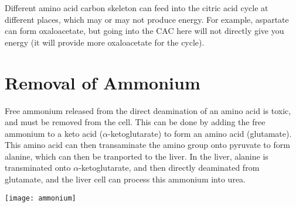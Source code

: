 Different amino acid carbon skeleton can feed into the citric acid cycle at different places, which may or may not produce energy.
For example, aspartate can form oxaloacetate, but going into the CAC here will not directly give you energy (it will provide more oxaloacetate for the cycle).

\section{Removal of Ammonium}

Free ammonium released from the direct deamination of an amino acid is toxic, and must be removed from the cell.
This can be done by adding the free ammonium to a keto acid ($\alpha$-ketoglutarate) to form an amino acid (glutamate).
This amino acid can then transaminate the amino group onto pyruvate to form alanine, which can then be tranported to the liver.
In the liver, alanine is transminated onto $\alpha$-ketoglutarate, and then directly deaminated from glutamate, and the liver cell can process this ammonium into urea.

\begin{center}
\texttt{[image: ammonium]}
\end{center}

